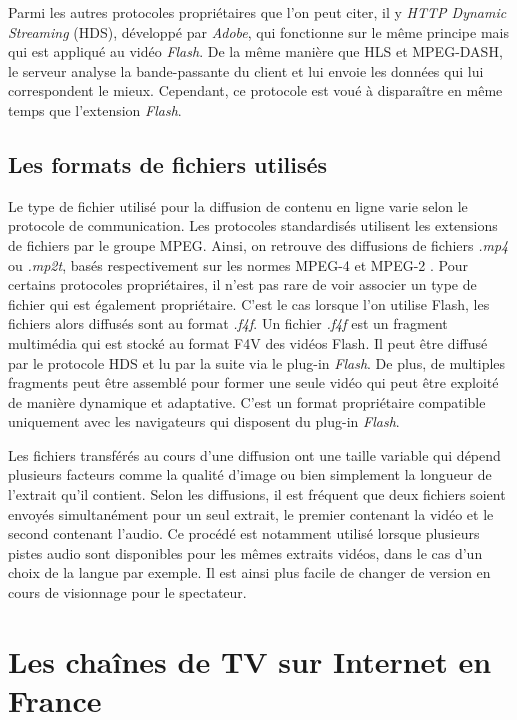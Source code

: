 \documentclass{polytech/polytech}
\begin{document}
Parmi les autres protocoles propriétaires que l’on peut citer, il y \textit{HTTP Dynamic Streaming} (HDS), développé par \textit{Adobe}, qui fonctionne sur le même principe mais qui est appliqué au vidéo \textit{Flash}. De la même manière que HLS et MPEG-DASH, le serveur analyse la bande-passante du client et lui envoie les données qui lui correspondent le mieux. Cependant, ce protocole est voué à disparaître en même temps que l’extension \textit{Flash}.


\section{Les formats de fichiers utilisés}

Le type de fichier utilisé pour la diffusion de contenu en ligne varie selon le protocole de communication. Les protocoles standardisés utilisent les extensions de fichiers par le groupe MPEG. Ainsi, on retrouve des diffusions de fichiers \textit{.mp4} ou \textit{.mp2t}, basés respectivement sur les normes MPEG-4 et MPEG-2 \cite{_mpeg-2_2018}. Pour certains protocoles propriétaires, il n'est pas rare de voir associer un type de fichier qui est également propriétaire. C'est le cas lorsque l'on utilise Flash, les fichiers alors diffusés sont au format \textit{.f4f}. Un fichier \textit{.f4f} est un fragment multimédia qui est stocké au format F4V des vidéos Flash. Il peut être diffusé par le protocole HDS et lu par la suite via le plug-in \textit{Flash}. De plus, de multiples fragments peut être assemblé pour former une seule vidéo qui peut être exploité de manière dynamique et adaptative. C'est un format propriétaire compatible uniquement avec les navigateurs qui disposent du plug-in \textit{Flash}.

Les fichiers transférés au cours d'une diffusion ont une taille variable qui dépend plusieurs facteurs comme la qualité d'image ou bien simplement la longueur de l'extrait qu'il contient. Selon les diffusions, il est fréquent que deux fichiers soient envoyés simultanément pour un seul extrait, le premier contenant la vidéo et le second contenant l'audio. Ce procédé est notamment utilisé lorsque plusieurs pistes audio sont disponibles pour les mêmes extraits vidéos, dans le cas d'un choix de la langue par exemple. Il est ainsi plus facile de changer de version en cours de visionnage pour le spectateur. 


\chapter{Les chaînes de TV sur Internet en France}
\end{document}
